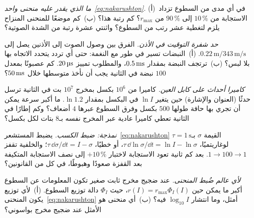 \begin{exercise}[\lvlB]
\label{ex:11:3}
\emph{ما الذي يقدر عليه منحنى واحد~\eqref{eq:nakarushton}.} (أ)~في أي مدى من السطوع تزداد الاستجابة من $10\,\%$ إلى $90\,\%$ من $r_{\max}$؟ كم رتبة هذا؟ (ب)~كم موضعًا للمنحنى المنزاح يلزم لتغطية عشر رتب من السطوع؟ واثنتي عشرة رتبة من الشدة الصوتية؟
\end{exercise}

\begin{exercise}[\lvlB]
\label{ex:11:4}
\emph{حد شفرة التوقيت في الأذن.} الفرق بين وصول الصوت إلى الأذنين يصل إلى $0.22\,\text{m}/343\,\text{m/s}$. (أ)~النبضات تسير في طور مع النغمة: حتى أي تردد يتحدد الاتجاه بها بلا لبس؟ (ب)~ترتجف النبضة بمقدار $0.5\,\text{ms}$، والمطلوب تمييز $20\,\text{\textmu s}$. كم عصبونًا بمعدل $100$ نبضة في الثانية يجب أن نأخذ متوسطها خلال $50\,\text{ms}$؟
\end{exercise}

\begin{exercise}[\lvlB]
\label{ex:11:5}
\emph{كاميرا أحداث على كابل العين.} كاميرا من $10^6$ بكسل بمخرج $10^7$ بت في الثانية ترسل حدثًا (العنوان والإشارة) حين يتغير $\ln I$ في البكسل بمقدار $\ln1.2$. ما أكبر سرعة يمكن أن تجري بها حافة طولها $500$ بكسل وفرق السطوع عبرها $4$ أضعاف؟ وكم إطارًا في الثانية تعطي كاميرا عادية عبر المخرج نفسه بـ$8$ بتات لكل بكسل؟
\end{exercise}

\begin{exercise}[\lvlB]
\label{ex:11:6}
\emph{نمذجة: ضبط الكسب.} يضبط المستشعر~\eqref{eq:nakarushton} القيمة $\sigma$ بـ$\tau=1\,\text{s}$ لوغاريتميًا، $\tau\,\dd\ln\sigma/\dd t=\ln I-\ln\sigma$، أو خطيًا، $\tau\,\dd\sigma/\dd t=I-\sigma$؛ والخلفية تقفز $1\to100\to1$. بعد كم ثانية تعود الاستجابة لاختبار $+10\,\%$ إلى نصف الاستجابة المتكيفة بعد القفزة صعودًا وهبوطًا، في كل من القانونين؟
\end{exercise}

\begin{exercise}[\lvlC]
\label{ex:11:7}
\emph{لأي عالم ضُبط المنحنى.} عند ضجيج مخرج ثابت صغير تكون المعلومات عن السطوع أكبر ما يمكن حين $r(I)=r_{\max}\Phi_I(I)$، حيث $\Phi_I$ دالة توزيع السطوع. (أ)~لأي توزيع يكون المنحنى~\eqref{eq:nakarushton} أمثل، وما انتشار $\log_{10}I$ فيه؟ (ب)~أي منحنى هو الأمثل عند ضجيج مخرج بواسوني؟
\end{exercise}
